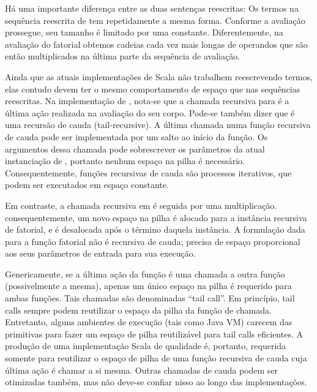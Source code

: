 H\'{a} uma importante diferen\c{c}a entre as duas senten\c{c}as reescritas:
Os termos na sequ\^{e}ncia reescrita de  tem repetidamente a
mesma forma. Conforme a avalia\c{c}\~{a}o prossegue, seu tamanho \'{e} limitado por
uma constante. Diferentemente, na avalia\c{c}\~{a}o do fatorial obtemos cadeias
cada vez mais longas de operandos que s\~{a}o ent\~{a}o multiplicados na \'{u}ltima
parte da sequ\^{e}ncia de avalia\c{c}\~{a}o. 

Ainda que as atuais implementa\c{c}\~{o}es de Scala n\~{a}o trabalhem reescrevendo
termos, elas contudo devem ter o mesmo comportamento de espa\c{c}o que nas
sequ\^{e}ncias reescritas. Na implementa\c{c}\~{a}o de , nota-se que  a 
chamada recursiva para  \'{e} a \'{u}ltima a\c{c}\~{a}o realizada na avalia\c{c}\~{a}o 
do seu corpo. Pode-se tamb\'{e}m dizer que  \'{e} uma recurs\~{a}o de cauda
(tail-recursive). A \'{u}ltima chamada numa fun\c{c}\~{a}o recursiva de cauda pode ser
implementada por um salto ao in\'{i}cio da fun\c{c}\~{a}o. Os argumentos dessa chamada 
pode sobrescrever os par\^{a}metros da atual instancia\c{c}\~{a}o de , portanto 
nenhum espa\c{c}o na pilha \'{e} necess\'{a}rio. Consequentemente, fun\c{c}\~{o}es recursivas de 
cauda s\~{a}o processos iterativos, que podem ser executados em espa\c{c}o constante.     

Em contraste, a chamada recursiva em  \'{e} seguida por uma 
multiplica\c{c}\~{a}o. consequentemente, um novo espa\c{c}o na pilha \'{e} alocado para a 
inst\^{a}ncia recursiva de fatorial, e \'{e} desalocada ap\'{o}s o t\'{e}rmino daquela 
inst\^{a}ncia. A formula\c{c}\~{a}o dada para a fun\c{c}\~{a}o fatorial n\~{a}o \'{e} recursiva de cauda;
 precisa de espa\c{c}o proporcional aos seus par\^{a}metros de entrada para sua
execu\c{c}\~{a}o. 

Genericamente, se a \'{u}ltima a\c{c}\~{a}o da fun\c{c}\~{a}o \'{e} uma chamada a outra fun\c{c}\~{a}o
(possivelmente a mesma), apenas um \'{u}nico espa\c{c}o na pilha \'{e} requerido para 
ambas fun\c{c}\~{o}es. Tais chamadas s\~{a}o denominadas ``tail call''. Em 
princ\'{i}pio, tail calls sempre podem reutilizar o espa\c{c}o da pilha da fun\c{c}\~{a}o 
de chamada. Entretanto, alguns ambientes de execu\c{c}\~{a}o (tais como Java VM) 
carecem das primitivas para fazer um espa\c{c}o de pilha reutiliz\'{a}vel para 
tail calls eficientes. A produ\c{c}\~{a}o de uma implementa\c{c}\~{a}o Scala de qualidade \'{e},
portanto, requerida somente para reutilizar o espa\c{c}o de pilha de uma fun\c{c}\~{a}o 
recursiva de cauda cuja \'{u}ltima a\c{c}\~{a}o \'{e} chamar a si mesma. Outras chamadas de 
cauda podem ser otimizadas tamb\'{e}m, mas n\~{a}o deve-se confiar nisso ao longo das
implementa\c{c}\~{o}es. 


